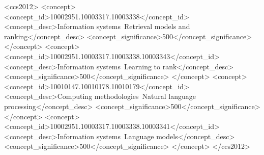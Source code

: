 \begin{abstract}
法律判決檢索同時面臨長文本、稀疏引用訊號與高度領域化語言。本研究的核心動機來自一個簡單現象：當 SAILER 這個由 THUIR@COLIEE 2023 提出的法律編碼模型與 BM25 都被限制為 512 tokens 時，SAILER 可以優於 BM25；但當 BM25 不受長度限制時，又會反過來高於受截斷的 SAILER。這說明長文本截斷，可能正是以嵌入為基礎的檢索模型（embedding-based retrieval，也常稱 dense retrieval）在法律判決檢索中難以穩定超越 lexical retrieval 的原因之一。為驗證此假設，本研究採用 ModernBERT-base 作為長文本 encoder，先在美國判決書語料上進行 domain-adaptive pretraining（DAPT），也就是以 masked language modeling（MLM）進行 continued pretraining，再於 Competition on Legal Information Extraction and Entailment（COLIEE）2025 與 2026 的 Task~1 上進行對比式 supervised fine-tuning（SFT）。

受限於單張 NVIDIA RTX 4080 SUPER 16GB，正式實驗僅能使用 4096 tokens。此外，受限於硬體限制，DAPT 約訓練 60 小時，也只覆蓋 0.384 epoch，沒有完整看過全部 673 萬篇美國判決書。儘管如此，實驗仍有三個明確發現。第一，整篇判決書 query 明顯優於引用上下文 query；在 2026 valid 上，當 query 由引用上下文擷取切換為清理後的整篇判決書時，ModernBERT DAPT+SFT 的 F1@5 由 0.1038 提升到 0.1650，SAILER 也由 0.1022 提升到 0.1213。第二，靜態 BM25 hard negatives 會使訓練接近失敗；穩定收斂主要依賴動態負樣本，而 query-specific 年份範圍過濾則帶來較小但一致的額外收益。第三，加入 scope filtering、LightGBM learning-to-rank，以及以 dynamic cut-off 為主要關鍵一環的 post-processing 後，FLNLP 最終在 COLIEE 2026 Task~1 取得 0.2935 的 F1，於 22 隊中排名第 7。整體而言，本研究說明：長文本處理、query 表示、負樣本選取與後段排序整合，是法律判決以嵌入為基礎的檢索模型能否成功的關鍵。The implementation of our method can be found at \url{https://github.com/emmanuelwithme/FLNLP-COLIEE2026}.
\end{abstract}

\begin{CCSXML}
<ccs2012>
   <concept>
       <concept_id>10002951.10003317.10003338</concept_id>
       <concept_desc>Information systems~Retrieval models and ranking</concept_desc>
       <concept_significance>500</concept_significance>
       </concept>
   <concept>
       <concept_id>10002951.10003317.10003338.10003343</concept_id>
       <concept_desc>Information systems~Learning to rank</concept_desc>
       <concept_significance>500</concept_significance>
       </concept>
   <concept>
       <concept_id>10010147.10010178.10010179</concept_id>
       <concept_desc>Computing methodologies~Natural language processing</concept_desc>
       <concept_significance>500</concept_significance>
       </concept>
   <concept>
       <concept_id>10002951.10003317.10003338.10003341</concept_id>
       <concept_desc>Information systems~Language models</concept_desc>
       <concept_significance>500</concept_significance>
       </concept>
 </ccs2012>
\end{CCSXML}

